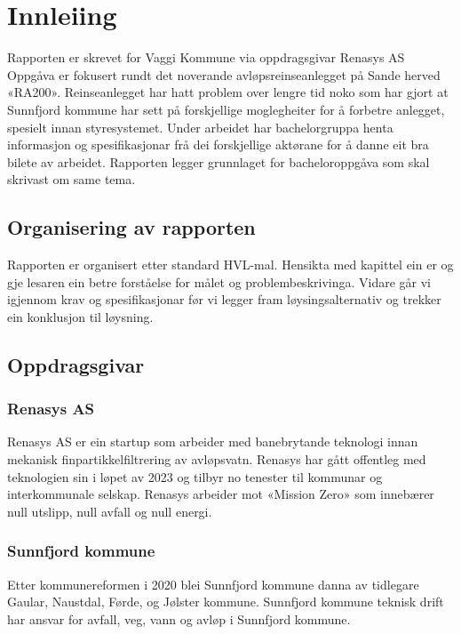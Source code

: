 \chapter{Innleiing}
\thispagestyle{fancy}
Rapporten er skrevet for Vaggi Kommune via oppdragsgivar Renasys AS
Oppgåva er fokusert rundt det noverande avløpsreinseanlegget på Sande herved «RA200». Reinseanlegget har hatt problem over lengre tid noko som har gjort at Sunnfjord kommune har sett på forskjellige moglegheiter for å forbetre anlegget, spesielt innan styresystemet.
Under arbeidet har bachelorgruppa henta informasjon og spesifikasjonar frå dei forskjellige aktørane for å danne eit bra bilete av arbeidet. Rapporten legger grunnlaget for bacheloroppgåva som skal skrivast om same tema.

\newpage
\section{Organisering av rapporten}
Rapporten er organisert etter standard HVL-mal.
Hensikta med kapittel ein er og gje lesaren ein betre forståelse for målet og problembeskrivinga. 
Vidare går vi igjennom krav og spesifikasjonar før vi legger fram løysingsalternativ og trekker ein konklusjon til løysning.

\section{Oppdragsgivar}

\subsection{Renasys AS}
Renasys AS er ein startup som arbeider med banebrytande teknologi innan mekanisk finpartikkelfiltrering av avløpsvatn. 
Renasys har gått offentleg med teknologien sin i løpet av 2023 og tilbyr no tenester til kommunar og interkommunale selskap. 
Renasys arbeider mot «Mission Zero» som innebærer null utslipp, null avfall og null energi.

\subsection{Sunnfjord kommune}
Etter kommunereformen i 2020 blei Sunnfjord kommune danna av tidlegare Gaular, Naustdal, Førde, og Jølster kommune. Sunnfjord kommune teknisk drift har ansvar for avfall, veg, vann og avløp i Sunnfjord kommune.